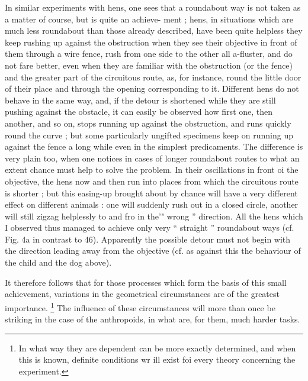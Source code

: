 \documentclass{article}
\begin{document}
In similar experiments with hens, one sees that a roundabout
way is not taken as a matter of course, but is quite an achieve-
ment ; hens, in situations which are much less roundabout
than those already described, have been quite helpless
they keep rushing up against the obstruction when they see
their objective in front of them through a wire fence, rush
from one side to the other all a-fluster, and do not fare
better, even when they are familiar with the obstruction
(or the fence) and the greater part of the circuitous route,
as, for instance, round the little door of their place and
through the opening corresponding to it. Different hens
do not behave in the same way, and, if the detour is shortened
while they are still pushing against the obstacle, it can easily
be observed how first one, then another, and so on, stops
running up against the obstruction, and runs quickly round
the curve ; but some particularly ungifted specimens keep on
running up against the fence a long while even in the simplest
predicaments. The difference is very plain too, when one
notices in cases of longer roundabout routes to what an
extent chance must help to solve the problem. In their
oscillations in front oi the objective, the hens now and then
run into places from which the circuitous route is shorter
;
but this easing-up brought about by chance will have a very
different effect on different animals : one will suddenly
rush out in a closed circle, another will still zigzag helplessly
to and fro in the'" wrong ” direction. All the hens which
I observed thus managed to achieve only very “ straight ”
roundabout ways (cf. Fig. 4a in contrast to 46). Apparently
the possible detour must not begin with the direction leading
away from the objective (cf. as against this the behaviour
of the child and the dog above).

It therefore follows that for those processes which form the
basis of this small achievement, variations in the geometrical
circumstances are of the greatest importance. \footnote{In what way they are dependent can be more exactly determined,
and when this is known, definite conditions wr ill exist foi every theory
concerning the experiment.} The influence
of these circumstances will more than once be striking in the case of the anthropoids, in what are, for them, much harder
tasks.
\end{document}
